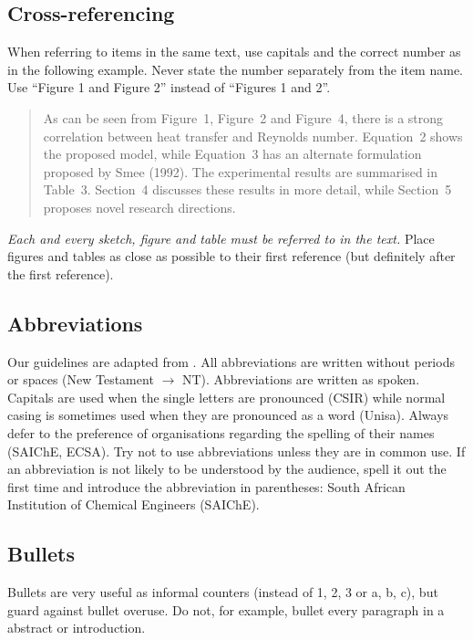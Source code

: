 \documentclass[a5paper, 10pt]{article}
\begin{document}
\subsection{Cross-referencing}
When referring to items in the same text, use capitals and the
correct number as in the following example. 
Never state the number separately from the item name. 
Use ``Figure 1 and Figure 2'' instead of ``Figures 1 and 2''.

\begin{quote}
  As can be seen from Figure~1, Figure~2 and Figure~4, there is a strong
  correlation between heat transfer and Reynolds number.  Equation~2
  shows the proposed model, while Equation~3 has an alternate
  formulation proposed by Smee (1992).  The experimental results are
  summarised in Table~3.  Section~4 discusses these results in more
  detail, while Section~5 proposes novel research directions.
\end{quote}

\emph{Each and every sketch, figure and  table must be referred to in the text.} 
Place figures and tables as close as possible to their first reference (but definitely after the first reference).  


\subsection{Abbreviations}
\label{sec:abbreviations}
Our guidelines are adapted from \citet[17]{burger}.  All abbreviations
are written without periods or spaces (New Testament $\rightarrow$
NT).  Abbreviations are written as spoken. Capitals are used when the
single letters are pronounced (CSIR) while normal casing is sometimes used
when they are pronounced as a word (Unisa).  Always defer to the
preference of organisations regarding the spelling of their names
(SAIChE, ECSA).  Try not to use abbreviations unless they are in
common use.  If an abbreviation is not likely to be understood by the
audience, spell it out the first time and introduce the abbreviation
in parentheses: South African Institution of Chemical Engineers (SAIChE).

\subsection{Bullets}
\label{sec:bullets}
Bullets are very useful as informal counters (instead of 1, 2, 3 or a, b, c), but guard against bullet overuse.
Do not, for example, bullet every paragraph in a abstract or introduction.
\end{document}

